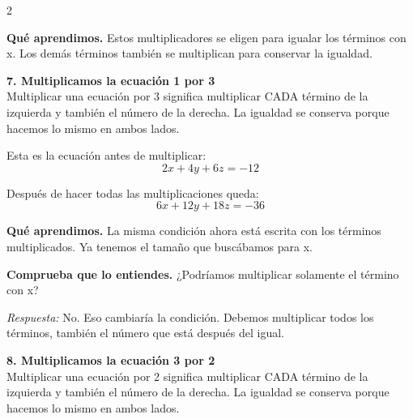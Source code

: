 \documentclass[11pt,a4paper,landscape]{article}
\begin{document}
\begin{multicols*}{2}
\begin{minipage}{\linewidth}
\par\smallskip\textbf{Qué aprendimos.} Estos multiplicadores se eligen para igualar los términos con x. Los demás términos también se multiplican para conservar la igualdad.
\end{minipage}\par\medskip
\noindent\begin{minipage}{\linewidth}\textbf{7. Multiplicamos la ecuación 1 por 3}\\[2pt]Multiplicar una ecuación por 3 significa multiplicar CADA término de la izquierda y también el número de la derecha. La igualdad se conserva porque hacemos lo mismo en ambos lados.
\par\smallskip Esta es la ecuación antes de multiplicar:
\[2x + 4y + 6z = -12\]
\par{}\par\smallskip
\par\smallskip Después de hacer todas las multiplicaciones queda:
\[6x + 12y + 18z = -36\]
\par\smallskip\textbf{Qué aprendimos.} La misma condición ahora está escrita con los términos multiplicados. Ya tenemos el tamaño que buscábamos para x.
\par\smallskip\textbf{Comprueba que lo entiendes.} ¿Podríamos multiplicar solamente el término con x?\par\textit{Respuesta:} No. Eso cambiaría la condición. Debemos multiplicar todos los términos, también el número que está después del igual.
\end{minipage}\par\medskip
\noindent\begin{minipage}{\linewidth}\textbf{8. Multiplicamos la ecuación 3 por 2}\\[2pt]Multiplicar una ecuación por 2 significa multiplicar CADA término de la izquierda y también el número de la derecha. La igualdad se conserva porque hacemos lo mismo en ambos lados.

\end{minipage}
\end{multicols*}
\end{document}
